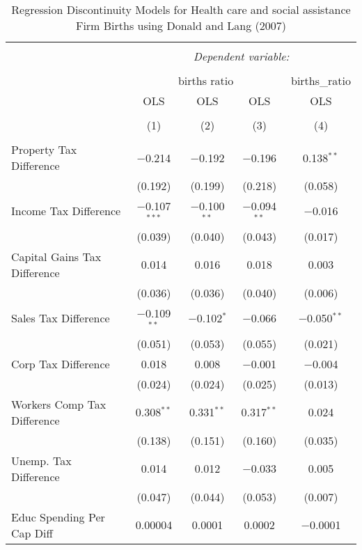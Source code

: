 
\begin{table}[!htbp] \centering 
  \caption{Regression Discontinuity Models for  Health care and social assistance Firm Births using Donald and Lang (2007)} 
  \label{} 
\begin{tabular}{@{\extracolsep{5pt}}lcccc} 
\\[-1.8ex]\hline 
\hline \\[-1.8ex] 
 & \multicolumn{4}{c}{\textit{Dependent variable:}} \\ 
\cline{2-5} 
\\[-1.8ex] & \multicolumn{3}{c}{births ratio} & births\_ratio \\ 
 & OLS & OLS & OLS & OLS \\ 
\\[-1.8ex] & (1) & (2) & (3) & (4)\\ 
\hline \\[-1.8ex] 
 Property Tax Difference & $-$0.214 & $-$0.192 & $-$0.196 & 0.138$^{**}$ \\ 
  & (0.192) & (0.199) & (0.218) & (0.058) \\ 
  Income Tax Difference & $-$0.107$^{***}$ & $-$0.100$^{**}$ & $-$0.094$^{**}$ & $-$0.016 \\ 
  & (0.039) & (0.040) & (0.043) & (0.017) \\ 
  Capital Gains Tax Difference & 0.014 & 0.016 & 0.018 & 0.003 \\ 
  & (0.036) & (0.036) & (0.040) & (0.006) \\ 
  Sales Tax Difference & $-$0.109$^{**}$ & $-$0.102$^{*}$ & $-$0.066 & $-$0.050$^{**}$ \\ 
  & (0.051) & (0.053) & (0.055) & (0.021) \\ 
  Corp Tax Difference & 0.018 & 0.008 & $-$0.001 & $-$0.004 \\ 
  & (0.024) & (0.024) & (0.025) & (0.013) \\ 
  Workers Comp Tax Difference & 0.308$^{**}$ & 0.331$^{**}$ & 0.317$^{**}$ & 0.024 \\ 
  & (0.138) & (0.151) & (0.160) & (0.035) \\ 
  Unemp. Tax Difference & 0.014 & 0.012 & $-$0.033 & 0.005 \\ 
  & (0.047) & (0.044) & (0.053) & (0.007) \\ 
  Educ Spending Per Cap Diff & 0.00004 & 0.0001 & 0.0002 & $-$0.0001 \\ 

\end{tabular}
\end{table}
